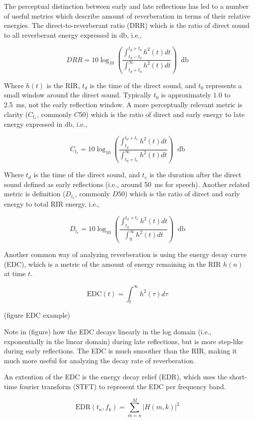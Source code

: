 The perceptual distinction between early and late reflections has led to a number of useful metrics which describe amount of reverberation in terms of their relative energies. The direct-to-reverberant ratio (DRR) which is the ratio of direct sound to all reverberant energy expressed in $\unit{\decibel}$, i.e.,

\[DRR = 10\log_{10}\left(\frac{\int_{t_d-t_0}^{t_d+t_0}h^2(t)dt}{\int_{t_d+t_0}^{\infty}h^2(t)dt}\right)\;\;\unit{\decibel}\]

Where $h(t)$ is the RIR, $t_d$ is the time of the direct sound, and $t_0$ represents a small window around the direct sound. Typically $t_0$ is approximately $1.0$ to \qty{2.5}{\milli\second}, not the early reflection window. A more perceptually relevant metric is clarity ($C_{t_e}$, commonly $C50$) which is the ratio of direct and early energy to late energy expressed in $\unit{\decibel}$, i.e.,

\[C_{t_e} = 10\log_{10}\left(\frac{\int_{t_d}^{t_d+t_e}h^2(t)dt}{\int_{t_d+t_e}^{\infty}h^2(t)dt}\right)\;\;\unit{\decibel}\]

Where $t_d$ is the time of the direct sound, and $t_e$ is the duration after the direct sound defined as early reflections (i.e., around \qty{50}{\milli\second} for speech). Another related metric is definition ($D_{t_e}$, commonly $D50$) which is the ratio of direct and early energy to total RIR energy, i.e.,

\[D_{t_e} = 10\log_{10}\left(\frac{\int_{t_d}^{t_d+t_e}h^2(t)dt}{\int_{0}^{\infty}h^2(t)dt}\right)\;\;\unit{\decibel}\]

Another common way of analyzing reverberation is using the energy decay curve (EDC), which is a metric of the amount of energy remaining in the RIR $h(n)$ at time $t$.

\[\mathrm{EDC}(t)=\int_{t}^{\infty}h^2(\tau)d\tau\]

(figure EDC example)

Note in (figure) how the EDC decays linearly in the log domain (i.e., exponentially in the linear domain) during late reflections, but is more step-like during early reflections. The EDC is much smoother than the RIR, making it much more useful for analyzing the decay rate of reverberation.

An extention of the EDC is the energy decay relief (EDR), which uses the short-time fourier transform (STFT) to represent the EDC per frequency band.

\[\mathrm{EDR}(t_n,f_k)=\sum_{m=n}^{M}|H(m,k)|^2\]

